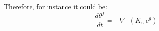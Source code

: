 Therefore, for instance it could be:
\begin{equation}
\frac{d \theta^f}{dt} = - {\nabla}\cdot  (K_w\, c^g)
\end{equation}
